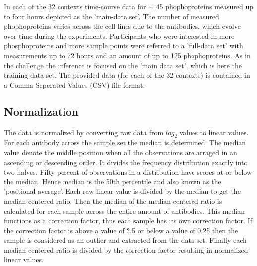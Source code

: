 In each of the 32 contexts time-course data for $\sim$ 45 phophoproteins measured up to four hours depicted as the 'main-data set'. The number of measured phophoproteins varies across the cell lines due to the antibodies, which evolve over time during the experiments. Participants who were interested in more phosphoproteins and more sample points were referred to a 'full-data set' with measurements up to 72 hours and an amount of up to 125 phophoproteins. %
As in the challenge the inference is focused on the 'main data set', which is here the training data set. The provided data (for each of the 32 contexts) is contained in a Comma Seperated Values (\gls{CSV}) file format.
\subsection*{Normalization}
The data is normalized by converting raw data from $log_2$ values to linear values. For each antibody across the sample set the median is determined. The median value denote the middle position when all the observations are arraged in an ascending or descending order. It divides the frequency distribution exactly into two halves. Fifty percent of observations in a distribution have scores at or below the median. Hence median is the 50th percentile and also known as the 'positional average'.
Each raw linear value is divided by the median to get the median-centered ratio. Then the median of the median-centered ratio is calculated for each sample across the entire amount of antibodies. This median functions as a correction factor, thus each sample has its own correction factor. If the correction factor is above a value of 2.5 or below a value of 0.25 then the sample is considered as an outlier and extracted from the data set. Finally each median-centered ratio is divided by the correction factor resulting in normalized linear values.\\
